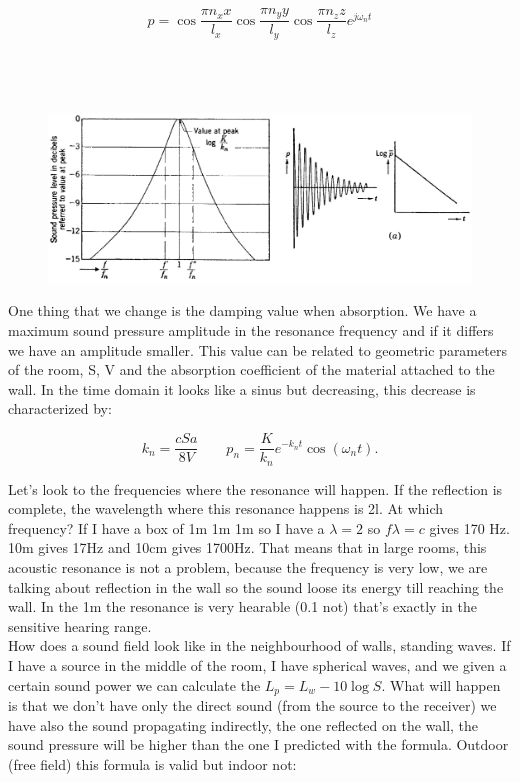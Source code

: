 	\begin{equation}
	p = \cos \frac{\pi n_x x}{l_x}\cos \frac{\pi n_y y}{l_y}\cos \frac{\pi n_z z}{l_z} e^{j\omega _n t}
	\end{equation}
	\ \\\\\\
	
	\begin{figure}
	\vspace{-5mm}
	\includegraphics[scale=0.2]{acoustics/ch4/9}
	\label{fig:4.9}
	\end{figure}
	One thing that we change is the damping value when absorption. We have a maximum sound pressure amplitude in the resonance frequency and if it differs we have an amplitude smaller. This value can be related to geometric parameters of the room, S, V and the absorption coefficient of the material attached to the wall. In the time domain it looks like a sinus but decreasing, this decrease is characterized by: 
	
	\begin{equation}
	k_n = \frac{cSa}{8V} \qquad p_n = \frac{K}{k_n} e^{-k_n t} \cos (\omega _n t).
	\end{equation}
	
	Let's look to the frequencies where the resonance will happen. If the reflection is complete, the wavelength where this resonance happens is 2l. At which frequency? If I have a box of 1m 1m 1m so I have a $\lambda = 2$ so $f\lambda = c$ gives 170 Hz. 10m gives 17Hz and 10cm gives 1700Hz. That means that in large rooms, this acoustic resonance is not a problem, because the frequency is very low, we are talking about reflection in the wall so the sound loose its energy till reaching the wall. In the 1m the resonance is very hearable (0.1 not) that's exactly in the sensitive hearing range. \\
	
	How does a sound field look like in the neighbourhood of walls, standing waves. If I have a source in the middle of the room, I have spherical waves, and we given a certain sound power we can calculate the $L_p = L_w - 10\log S$. What will happen is that we don't have only the direct sound (from the source to the receiver) we have also the sound propagating indirectly, the one reflected on the wall, the sound pressure will be higher than the one I predicted with the formula. Outdoor (free field) this formula is valid but indoor not:
	

